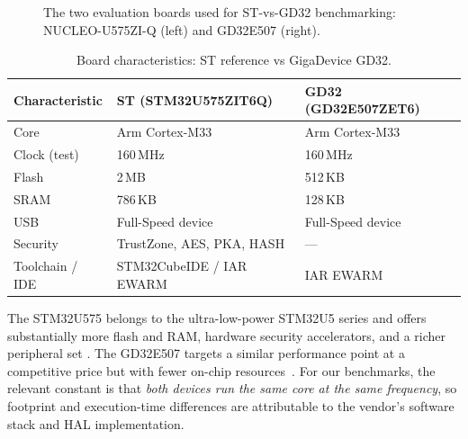 \begin{figure}[H]
\centering
{}
\caption{The two evaluation boards used for ST-vs-GD32 benchmarking: NUCLEO-U575ZI-Q (left) and GD32E507 (right).}
\label{fig:gd32-boards-photo}
\end{figure}

\begin{table}[H]
  \centering
  \caption{Board characteristics: ST reference vs GigaDevice GD32.}
  \label{tab:gd32-boards}
  \begin{tabularx}{\textwidth}{l X X}
    \toprule
    \textbf{Characteristic} & \textbf{ST (STM32U575ZIT6Q)} & \textbf{GD32 (GD32E507ZET6)} \\
    \midrule
    Core              & Arm Cortex-M33              & Arm Cortex-M33 \\
    Clock (test)      & 160\,MHz                    & 160\,MHz \\
    Flash             & 2\,MB                       & 512\,KB \\
    SRAM              & 786\,KB                     & 128\,KB \\
    USB               & Full-Speed device            & Full-Speed device \\
    Security          & TrustZone, AES, PKA, HASH    & --- \\
    Toolchain / IDE   & STM32CubeIDE / IAR EWARM     & IAR EWARM \\
    \bottomrule
  \end{tabularx}
\end{table}

The STM32U575 belongs to the ultra-low-power STM32U5 series and offers substantially more
flash and RAM, hardware security accelerators, and a richer peripheral set
\cite{stm32u575-ds}. The GD32E507 targets a similar performance point at a competitive
price but with fewer on-chip resources~\cite{gd32e507-ds}. For our benchmarks, the
relevant constant is that \emph{both devices run the same core at the same frequency},
so footprint and execution-time differences are attributable to the vendor's software stack
and HAL implementation.

